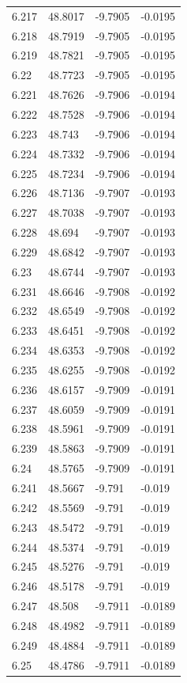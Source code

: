 \begin{tabular}{llll}
6.217 & 48.8017 & -9.7905 & -0.0195 \\
6.218 & 48.7919 & -9.7905 & -0.0195 \\
6.219 & 48.7821 & -9.7905 & -0.0195 \\
6.22 & 48.7723 & -9.7905 & -0.0195 \\
6.221 & 48.7626 & -9.7906 & -0.0194 \\
6.222 & 48.7528 & -9.7906 & -0.0194 \\
6.223 & 48.743 & -9.7906 & -0.0194 \\
6.224 & 48.7332 & -9.7906 & -0.0194 \\
6.225 & 48.7234 & -9.7906 & -0.0194 \\
6.226 & 48.7136 & -9.7907 & -0.0193 \\
6.227 & 48.7038 & -9.7907 & -0.0193 \\
6.228 & 48.694 & -9.7907 & -0.0193 \\
6.229 & 48.6842 & -9.7907 & -0.0193 \\
6.23 & 48.6744 & -9.7907 & -0.0193 \\
6.231 & 48.6646 & -9.7908 & -0.0192 \\
6.232 & 48.6549 & -9.7908 & -0.0192 \\
6.233 & 48.6451 & -9.7908 & -0.0192 \\
6.234 & 48.6353 & -9.7908 & -0.0192 \\
6.235 & 48.6255 & -9.7908 & -0.0192 \\
6.236 & 48.6157 & -9.7909 & -0.0191 \\
6.237 & 48.6059 & -9.7909 & -0.0191 \\
6.238 & 48.5961 & -9.7909 & -0.0191 \\
6.239 & 48.5863 & -9.7909 & -0.0191 \\
6.24 & 48.5765 & -9.7909 & -0.0191 \\
6.241 & 48.5667 & -9.791 & -0.019 \\
6.242 & 48.5569 & -9.791 & -0.019 \\
6.243 & 48.5472 & -9.791 & -0.019 \\
6.244 & 48.5374 & -9.791 & -0.019 \\
6.245 & 48.5276 & -9.791 & -0.019 \\
6.246 & 48.5178 & -9.791 & -0.019 \\
6.247 & 48.508 & -9.7911 & -0.0189 \\
6.248 & 48.4982 & -9.7911 & -0.0189 \\
6.249 & 48.4884 & -9.7911 & -0.0189 \\
6.25 & 48.4786 & -9.7911 & -0.0189 \\

\end{tabular}
